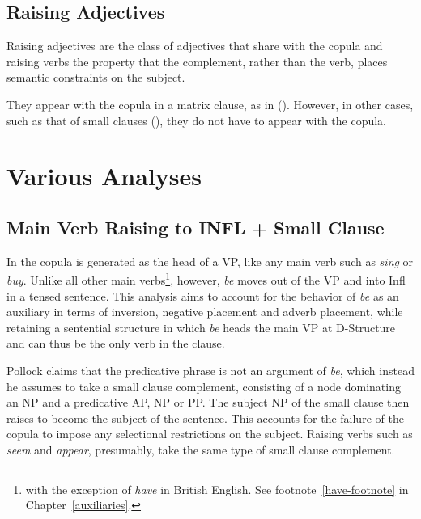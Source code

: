 

\subsection{Raising Adjectives}
\label{raising-adjs}

Raising adjectives are the class of adjectives that 
share with the copula and raising verbs the property
that the complement, rather than the verb, places semantic constraints on
the subject.  

They appear with the copula in a matrix clause, as in ({}).  However,
in other cases, such as that of small clauses ({}), they do not
have to appear with the copula.





\section{Various Analyses}
\label{sm-clause-other-analyses}

\subsection{Main Verb Raising to INFL + Small Clause}

In \cite{pollack89} the copula is generated as the head of a VP, like any main
verb such as {\it sing} or {\it buy}. Unlike all other main verbs\footnote{with
the exception of {\it have} in British English. See
footnote~\ref{have-footnote} in Chapter~\ref{auxiliaries}.}, however, {\it be}
moves out of the VP and into Infl in a tensed sentence.  This analysis aims to
account for the behavior of {\it be} as an auxiliary in terms of inversion,
negative placement and adverb placement, while retaining a sentential structure
in which {\it be} heads the main VP at D-Structure and can thus be the only
verb in the clause.

Pollock claims that the predicative phrase is not an argument of {\it be},
which instead he assumes to take a small clause complement, consisting of a
node dominating an NP and a predicative AP, NP or PP. The subject NP of the
small clause then raises to become the subject of the sentence.  This accounts
for the failure of the copula to impose any selectional restrictions on the
subject.  Raising verbs such as {\it seem} and {\it appear}, presumably, take the
same type of small clause complement.

